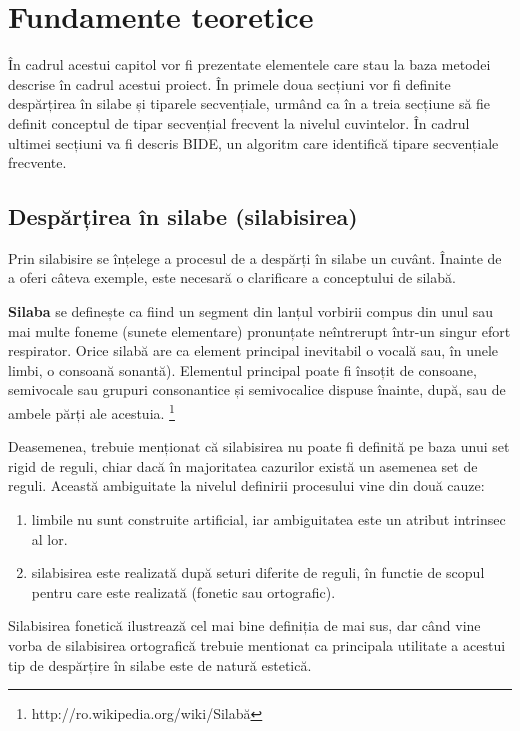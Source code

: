 \chapter{Fundamente teoretice}
\label{cap:fund-teoretice}

În cadrul acestui capitol vor fi prezentate elementele care stau la baza metodei descrise în cadrul acestui proiect. În primele doua secțiuni vor fi definite despărțirea în silabe și tiparele secvențiale, urmând ca în a treia secțiune să fie definit conceptul de tipar secvențial frecvent la nivelul cuvintelor. În cadrul ultimei secțiuni va fi descris BIDE, un algoritm care identifică tipare secvențiale frecvente.

\section{Despărțirea în silabe (silabisirea)}

Prin silabisire se înțelege a procesul de a despărți în silabe un cuvânt. Înainte de a oferi câteva exemple, este necesară o clarificare a conceptului de silabă. 

\begin{defi}
\textbf{Silaba} se definește ca fiind un segment din lanțul vorbirii compus din unul sau mai multe foneme (sunete elementare) pronunțate neîntrerupt într-un singur efort respirator. Orice silabă are ca element principal inevitabil o vocală sau, în unele limbi, o consoană sonantă). Elementul principal poate fi însoțit de consoane, semivocale sau grupuri consonantice și semivocalice dispuse înainte, după, sau de ambele părți ale acestuia. \footnote{http://ro.wikipedia.org/wiki/Silabă}
\end{defi} 

Deasemenea, trebuie menționat că silabisirea nu poate fi definită pe baza unui set rigid de reguli, chiar dacă în majoritatea cazurilor există un asemenea set de reguli. Această ambiguitate la nivelul definirii procesului vine din două cauze: 
\begin{enumerate}
\item limbile nu sunt construite artificial, iar ambiguitatea este un atribut intrinsec al lor. 
\item silabisirea este realizată după seturi diferite de reguli, în functie de scopul pentru care este realizată (fonetic sau ortografic).  
\end{enumerate}

Silabisirea fonetică ilustrează cel mai bine definiția de mai sus, dar când vine vorba de silabisirea ortografică trebuie mentionat ca principala utilitate a acestui tip de despărțire în silabe este de natură  estetică.

